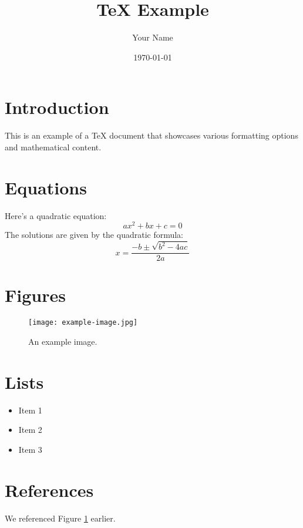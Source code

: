 \documentclass{article}
\title{TeX Example}
\author{Your Name}
\date{\today}
\begin{document}
\maketitle

\section{Introduction}
This is an example of a TeX document that showcases various formatting options and mathematical content.

\section{Equations}
Here's a quadratic equation:
\[
ax^2 + bx + c = 0
\]
The solutions are given by the quadratic formula:
\[
x = \frac{-b \pm \sqrt{b^2 - 4ac}}{2a}
\]

\section{Figures}
\begin{figure}[h]
    \centering
    \texttt{[image: example-image.jpg]}
    \caption{An example image.}
    \label{fig:example}
\end{figure}

\section{Lists}
\begin{itemize}
    \item Item 1
    \item Item 2
    \item Item 3
\end{itemize}

\section{References}
We referenced Figure \ref{fig:example} earlier.
\end{document}
